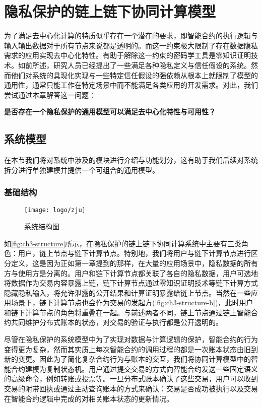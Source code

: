 \chapter{隐私保护的链上链下协同计算模型}

为了满足去中心化计算的特质似乎存在一个潜在的要求，即智能合约的执行逻辑与输入输出数据对于所有节点来说都是透明的。而这一约束极大限制了存在数据隐私需求的应用实现去中心化特性。有助于解除这一约束的密码学工具是零知识证明技术。如前所述，研究人员已经提出了一些满足各种隐私定义与信任假设的系统。然而他们对系统的具现化实现与一些特定信任假设的强依赖从根本上就限制了模型的通用性，通常只能工作在特定场景中而不能满足各类应用的开发需求。对此，我们尝试通过本章解答这一问题：
\begin{center}
    \textbf{是否存在一个隐私保护的通用模型可以满足去中心化特性与可用性？}
\end{center}
\section{系统模型}
在本节我们将对系统中涉及的模块进行介绍与功能划分，这有助于我们后续对系统拆分进行单独建模并提供一个可组合的通用模型。
\subsection{基础结构}
\begin{figure}[htbp]
    \centering
    \texttt{[image: logo/zju]}
    \caption{\label{fig:ch3-structure}系统结构图}
\end{figure}

如\autoref{fig:ch3-structure}所示，在隐私保护的链上链下协同计算系统中主要有三类角色：用户，链上节点与链下计算节点。特别地，我们将用户与链下计算节点进行区分定义，这是因为正如第一章提到的那样，在大量的应用场景中，隐私数据的所有方与使用方是分离的。用户和链下计算节点都关联了各自的隐私数据，用户可选地将数据作为交易内容暴露上链，链下计算节点通过零知识证明技术等链下计算方式隐藏隐私输入，将允许泄露的公开结果和计算证明暴露给链上节点。当然在一些应用场景下，链下计算节点也会作为交易的发起方(\autoref{fig:ch3-structure-b})，此时用户和链下计算节点的角色将重叠在一起。与前述两者不同，链上节点通过链上智能合约共同维护分布式账本的状态，对交易的验证与执行都是公开透明的。

尽管在隐私保护的系统模型中为了实现对数据与计算逻辑的保护，智能合约的行为变得更为复杂，然而其实质上每次智能合约的调用过程的都是一次账本状态由旧到新的变更。因此为了简化复杂合约行为与账本的交互，我们将协同计算模型中的智能合约建模为复制状态机。用户通过提交交易的方式向智能合约发送一些固定语义的高级命令，例如转账或投票等。一旦分布式账本确认了这些交易，用户可以收到交易的附带回执或通过主动查询账本的方式来确认：交易是否成功被执行以及交易在智能合约逻辑中完成的对相关账本状态的更新情况。

